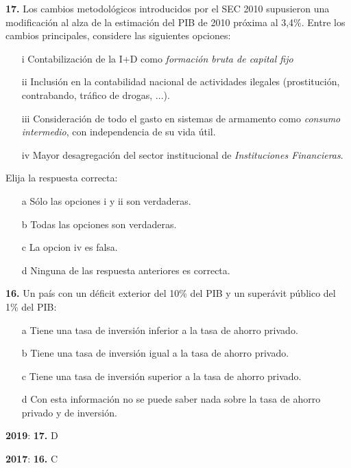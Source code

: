 \documentclass{nuevotema}
\begin{document}

\textbf{17.} Los cambios metodológicos introducidos por el SEC 2010 supusieron una modificación al alza de la estimación del PIB de 2010 próxima al 3,4\%. Entre los cambios principales, considere las siguientes opciones:

\begin{itemize}
	\item[i] Contabilización de la I+D como \textit{formación bruta de capital fijo}
	\item[ii] Inclusión en la contabilidad nacional de actividades ilegales (prostitución, contrabando, tráfico de drogas, ...).
	\item[iii] Consideración de todo el gasto en sistemas de armamento como \textit{consumo intermedio}, con independencia de su vida útil.
	\item[iv] Mayor desagregación del sector institucional de \textit{Instituciones Financieras}.
\end{itemize}

Elija la respuesta correcta:

\begin{itemize}
	\item[a] Sólo las opciones i y ii son verdaderas.
	\item[b] Todas las opciones son verdaderas.
	\item[c] La opcion iv es falsa.
	\item[d] Ninguna de las respuesta anteriores es correcta.
\end{itemize}


\textbf{16.} Un país con un déficit exterior del 10\% del PIB y un superávit público del 1\% del PIB:

\begin{itemize}
	\item[a] Tiene una tasa de inversión inferior a la tasa de ahorro privado.
	\item[b] Tiene una tasa de inversión igual a la tasa de ahorro privado.
	\item[c] Tiene una tasa de inversión superior a la tasa de ahorro privado.
	\item[d] Con esta información no se puede saber nada sobre la tasa de ahorro privado y de inversión.
\end{itemize}

\notas

\textbf{2019}: \textbf{17.} D

\textbf{2017}: \textbf{16.} C
\end{document}

